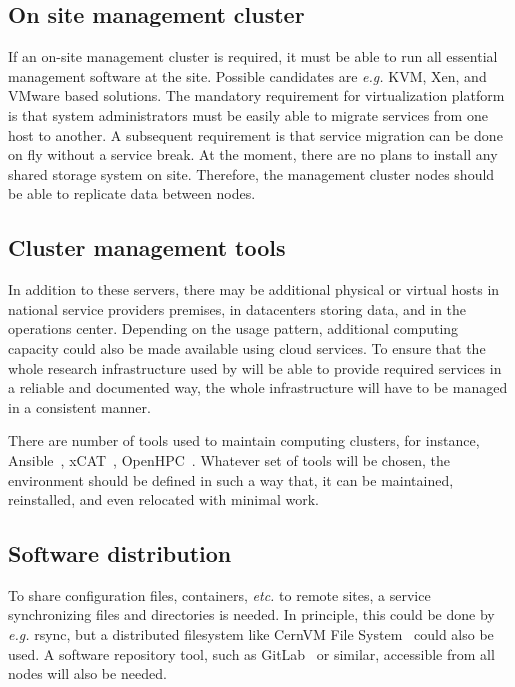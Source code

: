 \documentclass[12pt,a4paper]{article}
\begin{document}
\subsection{On site management cluster}
\label{sec:onsitemanagementcluster}
If an on-site management cluster is required, it must be able to run all essential management software at the site. Possible candidates are \emph{e.g.} KVM, Xen, and VMware based solutions. 
The mandatory requirement for virtualization platform is that system administrators must be easily able to migrate services from one host to another. 
A subsequent requirement is that service migration can be done on fly without a service break. 
At the moment, there are no plans to install any shared storage system on site. 
Therefore, the management cluster nodes should be able to replicate data between nodes.

\subsection{Cluster management tools}
\label{ssec:clust-manag}
In addition to these servers, there may be additional physical or virtual hosts in national service providers premises, in datacenters storing \ED data, and in the \ED operations center.
Depending on the usage pattern, additional computing capacity could also be made available using cloud services. 
To ensure that the whole research infrastructure used by \ED will be able to provide required services in a reliable and documented way, the whole infrastructure will have to be managed in a consistent manner. 

There are number of tools used to maintain computing clusters, for instance, Ansible~\cite{ansible},
xCAT~\cite{xcat}, OpenHPC~\cite{openhpc}. 
Whatever set of tools will be chosen, the environment should be defined in such a way that, it can be maintained, reinstalled, and even relocated with minimal work.

\subsection{Software distribution}

To share configuration files, containers, \emph{etc.} to remote sites, a  service synchronizing files and directories is needed. 
In principle, this could be done by \emph{e.g.} rsync, but a distributed filesystem like CernVM File System~\cite{cernvmfs} could also be used. 
A software repository tool, such as GitLab~\cite{gitlab}
or similar, accessible from all \ED nodes will also be needed.
\end{document}
